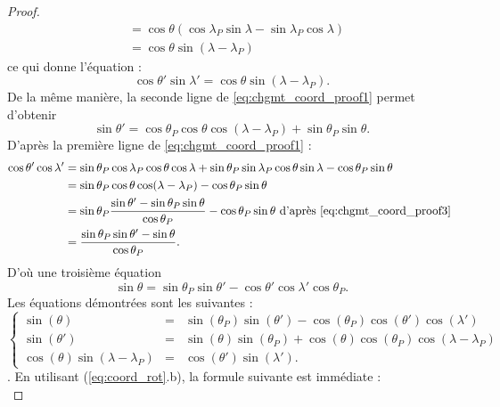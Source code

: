 \begin{proof}
\begin{align*}
	& = \cos \theta ( \cos \lambda_P \sin \lambda - \sin \lambda_P \cos \lambda) \\
	& = \cos \theta \sin (\lambda - \lambda_P)
\end{align*}
ce qui donne l'équation :
\begin{equation}
\cos \theta' \sin \lambda' = \cos \theta \sin (\lambda - \lambda_P).
\label{eq:chgmt_coord_proof2}
\end{equation}
De la même manière, la seconde ligne de \eqref{eq:chgmt_coord_proof1} permet d'obtenir
\begin{equation}
\sin \theta' = \cos \theta_P \cos \theta \cos (\lambda - \lambda_P) + \sin \theta_P \sin \theta .
\label{eq:chgmt_coord_proof3}
\end{equation}
D'après la première ligne de \eqref{eq:chgmt_coord_proof1} :
\begin{align*}
\cos \theta' \cos \lambda' & = \sin \theta_P \cos \lambda_P \cos \theta \cos \lambda + \sin \theta_P \sin \lambda_P \cos \theta \sin \lambda - \cos \theta_P \sin \theta \\
	& = \sin \theta_P \cos \theta \cos ( \lambda - \lambda_P) - \cos \theta_P \sin \theta \\
	& = \sin \theta_P \dfrac{\sin \theta' - \sin \theta_P \sin \theta}{\cos \theta_P} - \cos \theta_P \sin \theta \text{ d'après \eqref{eq:chgmt_coord_proof3} } \\
	& = \dfrac{\sin \theta_P \sin \theta' - \sin \theta}{\cos \theta_P}.
\end{align*}
D'où une troisième équation
\begin{equation}
\sin \theta = \sin \theta_P \sin \theta' - \cos \theta' \cos \lambda' \cos \theta_P .
\label{eq:chgmt_coord_proof4}
\end{equation}
Les équations démontrées sont les suivantes :
\begin{equation}
\label{eq:coord_rot}
\left\lbrace 
\begin{array}{rcl}
\sin ( \theta ) & = & \sin( \theta_P) \sin( \theta') - \cos( \theta_P) \cos( \theta') \cos( \lambda' ) \\
\sin( \theta' ) & = & \sin( \theta) \sin(\theta_P) + \cos( \theta ) \cos( \theta_P) \cos( \lambda - \lambda_P ) \\
\cos( \theta ) \sin( \lambda - \lambda_P) & = & \cos( \theta' ) \sin( \lambda' ).
\end{array}
\right.
\end{equation}.
En utilisant (\ref{eq:coord_rot}.b), la formule suivante est immédiate :
\begin{equation}

\end{equation}
\end{proof}
